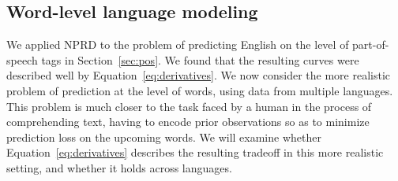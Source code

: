 \documentclass[entropy,article,submit,moreauthors,pdftex,10pt,a4paper]{Definitions/mdpi}
\newcommand{\past}{\overleftarrow{X}}
\begin{document}


\subsection{Word-level language modeling}\label{sec:words}


We applied NPRD to the problem of predicting English on the level of part-of-speech tags in Section~\ref{sec:pos}.
We found that the resulting curves were described well by Equation~\ref{eq:derivatives}.
We now consider the more realistic problem of prediction at the level of words, using data from multiple languages.
This problem is much closer to the task faced by a human in the process of comprehending text, having to encode prior observations so as to minimize prediction loss on the upcoming words.
We will examine whether Equation~\ref{eq:derivatives} describes the resulting tradeoff in this more realistic setting, and whether it holds across languages.
\end{document}
